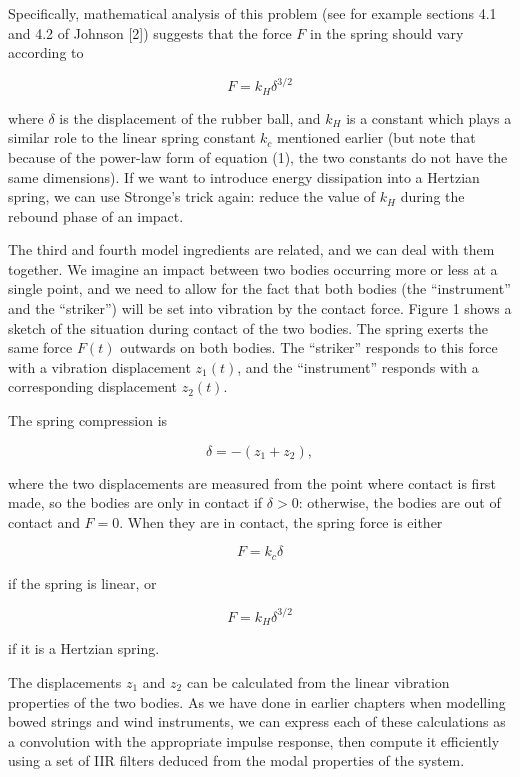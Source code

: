   Specifically, mathematical analysis of this problem (see for example sections 
  4.1 and 4.2 of Johnson [2]) suggests that the force $F$ in the spring should 
  vary according to 

  $$F=k_H \delta^{3/2} \tag{1}$$ 

  where $\delta$ is the displacement of the rubber ball, and $k_H$ is a 
  constant which plays a similar role to the linear spring constant $k_c$ 
  mentioned earlier (but note that because of the power-law form of equation 
  (1), the two constants do not have the same dimensions). If we want to 
  introduce energy dissipation into a Hertzian spring, we can use Stronge's 
  trick again: reduce the value of $k_H$ during the rebound phase of an impact. 

  The third and fourth model ingredients are related, and we can deal with them 
  together. We imagine an impact between two bodies occurring more or less at a 
  single point, and we need to allow for the fact that both bodies (the 
  ``instrument'' and the ``striker'') will be set into vibration by the contact 
  force. Figure 1 shows a sketch of the situation during contact of the two 
  bodies. The spring exerts the same force $F(t)$ outwards on both bodies. The 
  ``striker'' responds to this force with a vibration displacement $z_1(t)$, 
  and the ``instrument'' responds with a corresponding displacement $z_2(t)$. 

  The spring compression is 

  $$\delta=-(z_1+z_2), \tag{2}$$ 

  where the two displacements are measured from the point where contact is 
  first made, so the bodies are only in contact if $\delta > 0$: otherwise, the 
  bodies are out of contact and $F=0$. When they are in contact, the spring 
  force is either 

  $$F=k_c\delta \tag{3}$$ 

  if the spring is linear, or 

  $$F=k_H\delta^{3/2} \tag{4}$$ 

  if it is a Hertzian spring. 

  The displacements $z_1$ and $z_2$ can be calculated from the linear vibration 
  properties of the two bodies. As we have done in earlier chapters when 
  modelling bowed strings and wind instruments, we can express each of these 
  calculations as a convolution with the appropriate impulse response, then 
  compute it efficiently using a set of IIR filters deduced from the modal 
  properties of the system. 

